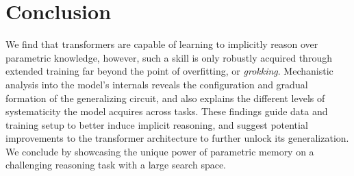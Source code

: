 \section{Conclusion}
We find that transformers are capable of learning to implicitly reason over parametric knowledge, however, such a skill is only robustly acquired through extended training far beyond the point of overfitting, or \textit{grokking}. Mechanistic analysis into the model's internals reveals the configuration and gradual formation of the generalizing circuit, and also explains the different levels of systematicity the model acquires across tasks. These findings guide data and training setup to better induce implicit reasoning, and suggest potential improvements to the transformer architecture to further unlock its generalization. We conclude by showcasing the unique power of parametric memory on a challenging reasoning task with a large search space.